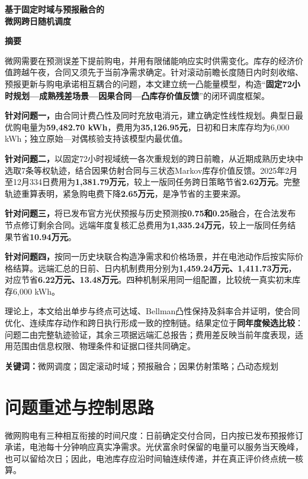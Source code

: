 \documentclass[UTF8,a4paper,zihao=-4,fontset=mac]{ctexart}
\begin{document}
\pagestyle{plain}
\begin{center}
{\LARGE\bfseries 基于固定时域与预报融合的\\微网跨日随机调度}\par\vspace{1em}
{\large\bfseries 摘\quad 要}
\end{center}
微网需要在预测误差下提前购电，并用有限储能响应实时供需变化。库存的经济价值跨越午夜，合同又须先于当前净需求确定。针对滚动前瞻长度随日内时刻收缩、预报更新与购电承诺相互耦合的问题，本文建立统一凸能量模型，构造“\textbf{固定72小时规划—成熟残差场景—因果合同—凸库存价值反馈}”的闭环调度框架。

\textbf{针对问题一，}由合同计费凸性及同时充放电消元，建立确定性线性规划。典型日最优购电量为\textbf{59,482.70 kWh}，费用为\textbf{35,126.95元}，日初和日末库存均为6,000 kWh；独立原始—对偶核验支持该模型内最优值。

\textbf{针对问题二，}以固定72小时视域统一各次重规划的跨日前瞻，从近期成熟历史块中选取7条等权轨迹，结合因果仿射合同与三状态Markov库存价值反馈。2025年2月至12月334日费用为\textbf{1,381.79万元}，较上一版同任务跨日策略节省\textbf{2.62万元}。完整轨迹重算表明，紧急购电费下降\textbf{2.65万元}，是净节省的主要来源。

\textbf{针对问题三，}将已发布官方光伏预报与历史预测按\textbf{0.75和0.25}融合，在合法发布节点修订剩余合同。远端年度复核汇总费用为\textbf{1,335.24万元}，较上一版同任务结果节省\textbf{10.94万元}。

\textbf{针对问题四，}按同一历史块联合构造净需求和价格场景，并在电池动作后按实际价格结算。远端汇总的日前、日内机制费用分别为\textbf{1,459.24万元、1,411.73万元}，对应节省\textbf{6.22万元、13.48万元}。四种机制采用同一组配置，比较统一真实初末库存6,000 kWh。

理论上，本文给出单步与终点可达域、Bellman凸性保持及斜率合并证明，使合同优化、连续库存动作和跨日执行形成一致的控制链。结果定位于\textbf{同年度候选比较}：问题二由完整轨迹验证，其余三项据远端汇总报告；费用差反映当前年度表现，适用范围由信息权限、物理条件和证据口径共同确定。

\noindent\textbf{关键词：}微网调度；固定滚动时域；预报融合；因果仿射策略；凸动态规划
\clearpage

\section{问题重述与控制思路}
微网购电有三种相互衔接的时间尺度：日前确定交付合同，日内按已发布预报修订承诺，电池每十分钟响应真实净需求。光伏富余时保留的电量可以服务当天晚峰，也可以留给次日；因此，电池库存应沿时间轴连续传递，并在真正评价终点统一核算。
\end{document}
